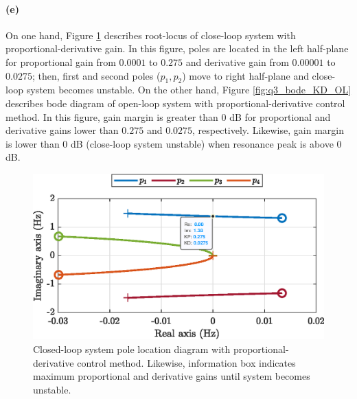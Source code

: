\paragraph{(e)} On one hand,  Figure  \ref{fig:q3_rlocus_KD_CL} describes root-locus of close-loop system with proportional-derivative gain. In this figure, poles are located in the left half-plane for proportional gain from $0.0001$ to $0.275$ and derivative gain from $0.00001$ to $0.0275$; then, first and second poles ($p_1, p_2$) move to right half-plane and close-loop system becomes unstable. On the other hand, Figure \ref{fig:q3_bode_KD_OL} describes bode diagram of open-loop system with proportional-derivative control method. In this figure, gain margin is greater than $0$ dB for proportional and derivative gains lower than $0.275$ and $0.0275$, respectively. Likewise, gain margin is lower than $0$ dB (close-loop system unstable) when resonance peak is above $0$  dB. 


\begin{figure}[h!]
	\centering
	\includegraphics{images/question3/q3_rlocus_KD_CL.eps}
	\caption{Closed-loop system pole location diagram with proportional-derivative control method. Likewise, information box indicates maximum proportional and derivative gains until system becomes unstable.}
	\label{fig:q3_rlocus_KD_CL}
\end{figure}



